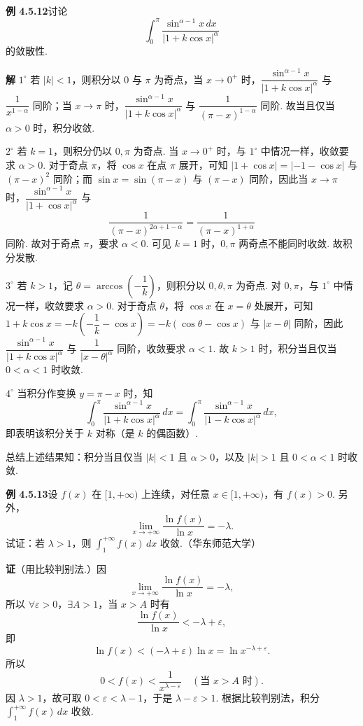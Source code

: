 \documentclass[UTF8,12pt,a4paper,fontset=fandol]{ctexart}
\begin{document}
\noindent\textbf{例 4.5.12}\quad 讨论
\[
\int_0^\pi\frac{\sin^{\alpha-1}x\,dx}{|1+k\cos x|^\alpha}
\]
的敛散性.

\noindent\textbf{解}\quad
$1^\circ$ 若 $|k|<1$，则积分以 $0$ 与 $\pi$ 为奇点，当 $x\to0^+$ 时，$\dfrac{\sin^{\alpha-1}x}{|1+k\cos x|^\alpha}$ 与 $\dfrac1{x^{1-\alpha}}$ 同阶；当 $x\to\pi$ 时，$\dfrac{\sin^{\alpha-1}x}{|1+k\cos x|^\alpha}$ 与 $\dfrac1{(\pi-x)^{1-\alpha}}$ 同阶. 故当且仅当 $\alpha>0$ 时，积分收敛.

$2^\circ$ 若 $k=1$，则积分仍以 $0,\pi$ 为奇点. 当 $x\to0^+$ 时，与 $1^\circ$ 中情况一样，收敛要求 $\alpha>0$. 对于奇点 $\pi$，将 $\cos x$ 在点 $\pi$ 展开，可知 $|1+\cos x|=|-1-\cos x|$ 与 $(\pi-x)^2$ 同阶；而 $\sin x=\sin(\pi-x)$ 与 $(\pi-x)$ 同阶，因此当 $x\to\pi$ 时，$\dfrac{\sin^{\alpha-1}x}{|1+\cos x|^\alpha}$ 与
\[
\frac1{(\pi-x)^{2\alpha+1-\alpha}}
=\frac1{(\pi-x)^{1+\alpha}}
\]
同阶. 故对于奇点 $\pi$，要求 $\alpha<0$. 可见 $k=1$ 时，$0,\pi$ 两奇点不能同时收敛. 故积分发散.

$3^\circ$ 若 $k>1$，记 $\theta=\arccos\left(-\dfrac1k\right)$，则积分以 $0,\theta,\pi$ 为奇点. 对 $0,\pi$，与 $1^\circ$ 中情况一样，收敛要求 $\alpha>0$. 对于奇点 $\theta$，将 $\cos x$ 在 $x=\theta$ 处展开，可知 $1+k\cos x=-k\left(-\dfrac1k-\cos x\right)=-k(\cos\theta-\cos x)$ 与 $|x-\theta|$ 同阶，因此 $\dfrac{\sin^{\alpha-1}x}{|1+k\cos x|^\alpha}$ 与 $\dfrac1{|x-\theta|^\alpha}$ 同阶，收敛要求 $\alpha<1$. 故 $k>1$ 时，积分当且仅当 $0<\alpha<1$ 时收敛.

$4^\circ$ 当积分作变换 $y=\pi-x$ 时，知
\[
\int_0^\pi\frac{\sin^{\alpha-1}x}{|1+k\cos x|^\alpha}\,dx
=\int_0^\pi\frac{\sin^{\alpha-1}x}{|1-k\cos x|^\alpha}\,dx,
\]
即表明该积分关于 $k$ 对称（是 $k$ 的偶函数）.

总结上述结果知：积分当且仅当 $|k|<1$ 且 $\alpha>0$，以及 $|k|>1$ 且 $0<\alpha<1$ 时收敛.

\noindent\textbf{例 4.5.13}\quad 设 $f(x)$ 在 $[1,+\infty)$ 上连续，对任意 $x\in[1,+\infty)$，有 $f(x)>0$. 另外，
\[
\lim_{x\to+\infty}\frac{\ln f(x)}{\ln x}=-\lambda.
\]
试证：若 $\lambda>1$，则 $\displaystyle\int_1^{+\infty}f(x)\,dx$ 收敛.（华东师范大学）

\noindent\textbf{证}\quad （用比较判别法.）因
\[
\lim_{x\to+\infty}\frac{\ln f(x)}{\ln x}=-\lambda,
\]
所以 $\forall\varepsilon>0$，$\exists A>1$，当 $x>A$ 时有
\[
\frac{\ln f(x)}{\ln x}<-\lambda+\varepsilon,
\]
即
\[
\ln f(x)<(-\lambda+\varepsilon)\ln x=\ln x^{-\lambda+\varepsilon}.
\]
所以
\[
0<f(x)<\frac1{x^{\lambda-\varepsilon}}\quad(\text{当 }x>A\text{ 时}).
\]
因 $\lambda>1$，故可取 $0<\varepsilon<\lambda-1$，于是 $\lambda-\varepsilon>1$. 根据比较判别法，积分 $\displaystyle\int_1^{+\infty}f(x)\,dx$ 收敛.
\end{document}
